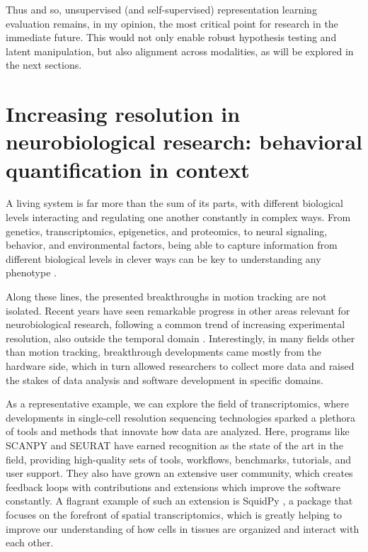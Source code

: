 Thus and so, unsupervised (and self-supervised) representation learning evaluation remains, in my opinion, the most critical point for research in the immediate future. This would not only enable robust hypothesis testing and latent manipulation, but also alignment across modalities, as will be explored in the next sections.

\section{Increasing resolution in neurobiological research: behavioral quantification in context}

A living system is far more than the sum of its parts, with different biological levels interacting and regulating one another constantly in complex ways. From genetics, transcriptomics, epigenetics, and proteomics, to neural signaling, behavior, and environmental factors, being able to capture information from different biological levels in clever ways can be key to understanding any phenotype \cite{Miranda2023IncreasingBehaviors}.

Along these lines, the presented breakthroughs in motion tracking are not isolated. Recent years have seen remarkable progress in other areas relevant for neurobiological research, following a common trend of increasing experimental resolution, also outside the temporal domain \cite{Miranda2023IncreasingBehaviors}. Interestingly, in many fields other than motion tracking, breakthrough developments came mostly from the hardware side, which in turn allowed researchers to collect more data and raised the stakes of data analysis and software development in specific domains. 

As a representative example, we can explore the field of transcriptomics, where developments in single-cell resolution sequencing technologies sparked a plethora of tools and methods that innovate how data are analyzed. Here, programs like SCANPY \cite{Wolf2018SCANPY:Analysis} and SEURAT \cite{Hao2021IntegratedData} have earned recognition as the state of the art in the field, providing high-quality sets of tools, workflows, benchmarks, tutorials, and user support. They also have grown an extensive user community, which creates feedback loops with contributions and extensions which improve the software constantly. A flagrant example of such an extension is SquidPy \cite{Palla2022Squidpy:Analysis}, a package that focuses on the forefront of spatial transcriptomics,  which is greatly helping to improve our understanding of how cells in tissues are organized and interact with each other. 

